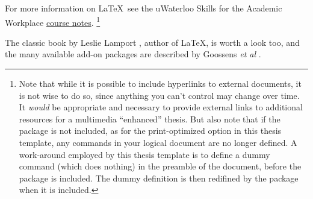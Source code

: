 For more information on \LaTeX\, see the uWaterloo Skills for the Academic Workplace  \href{https://uwaterloo.ca/information-systems-technology/services/electronic-thesis-preparation-and-submission-support/ethesis-guide/creating-pdf-version-your-thesis/creating-pdf-files-using-latex/latex-ethesis-and-large-documents}{course notes}. 
\footnote{
Note that while it is possible to include hyperlinks to external documents,
it is not wise to do so, since anything you can't control may change over time. 
It \emph{would} be appropriate and necessary to provide external links to 
additional resources for a multimedia ``enhanced'' thesis. 
But also note that if the  package is not included, 
as for the print-optimized option in this thesis template, any  
commands in your logical document are no longer defined.
A work-around employed by this thesis template is to define a dummy  
command (which does nothing) in the preamble of the document, 
before the  package is included. 
The dummy definition is then redifined by the
 package when it is included.
}

The classic book by Leslie Lamport \cite{lamport.book}, author of \LaTeX , is worth a look too, and the many available add-on packages are described by 
Goossens \textit{et al} \cite{goossens.book}.